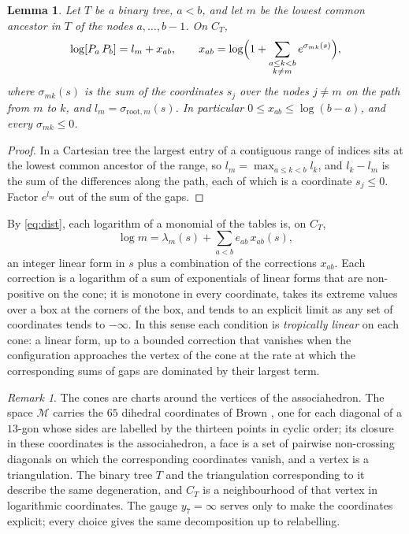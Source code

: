 \documentclass[11pt,a4paper]{article}
\newtheorem{lemma}[theorem]{Lemma}
\theoremstyle{definition}
\theoremstyle{remark}
\newtheorem{remark}[theorem]{Remark}
\newcommand{\br}[2]{[#1\,#2]}
\newcommand{\Mo}{\mathcal{M}}
\begin{document}
\begin{lemma}\label{lem:dist}
Let $T$ be a binary tree, $a < b$, and let $m$ be the lowest common ancestor in $T$ of the nodes
$a, \dots, b - 1$. On $C_T$,
\begin{equation}\label{eq:dist}
\log \br{P_a}{P_b} = l_m + x_{ab}, \qquad
x_{ab} = \log\Bigl(1 + \sum_{\substack{a \le k < b\\ k \ne m}} e^{\sigma_{mk}(s)}\Bigr),
\end{equation}
where $\sigma_{mk}(s)$ is the sum of the coordinates $s_j$ over the nodes $j \ne m$ on the path from $m$ to
$k$, and $l_m = \sigma_{\mathrm{root},m}(s)$. In particular $0 \le x_{ab} \le \log(b - a)$, and every
$\sigma_{mk} \le 0$.
\end{lemma}

\begin{proof}
In a Cartesian tree the largest entry of a contiguous range of indices sits at the lowest common ancestor
of the range, so $l_m = \max_{a \le k < b} l_k$, and $l_k - l_m$ is the sum of the differences along the
path, each of which is a coordinate $s_j \le 0$. Factor $e^{l_m}$ out of the sum of the gaps.
\end{proof}

By \eqref{eq:dist}, each logarithm of a monomial of the tables is, on $C_T$,
\[
  \log m = \lambda_m(s) + \sum_{a<b} e_{ab}\,x_{ab}(s),
\]
an integer linear form in $s$ plus a combination of the corrections $x_{ab}$. Each correction is a
logarithm of a sum of exponentials of linear forms that are non-positive on the cone; it is monotone in
every coordinate, takes its extreme values over a box at the corners of the box, and tends to an explicit
limit as any set of coordinates tends to $-\infty$. In this sense each condition is \emph{tropically
linear} on each cone: a linear form, up to a bounded correction that vanishes when the configuration
approaches the vertex of the cone at the rate at which the corresponding sums of gaps are dominated by
their largest term.

\begin{remark}
The cones are charts around the vertices of the associahedron. The space $\Mo$ carries the $65$ dihedral
coordinates of Brown \cite{Brown}, one for each diagonal of a $13$-gon whose sides are labelled by the
thirteen points in cyclic order; its closure in these coordinates is the associahedron, a face is a set of
pairwise non-crossing diagonals on which the corresponding coordinates vanish, and a vertex is a
triangulation. The binary tree $T$ and the triangulation corresponding to it describe the same
degeneration, and $C_T$ is a neighbourhood of that vertex in logarithmic coordinates. The gauge $y_7 =
\infty$ serves only to make the coordinates explicit; every choice gives the same decomposition up to
relabelling.
\end{remark}
\end{document}
